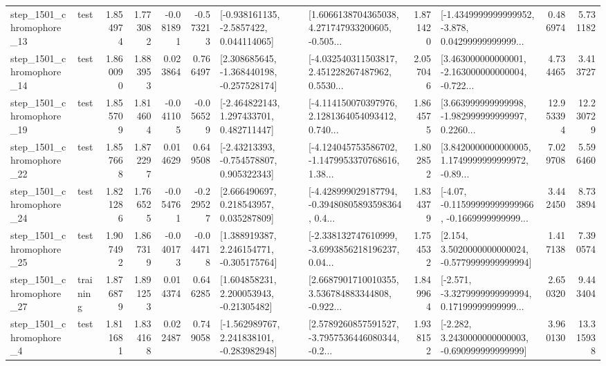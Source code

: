 \begin{tabular}{llrrrrllrlrr}
 step\_1501\_chromophore\_13 &      test &      1.854974 &    1.773082 &     -0.081891 & -0.573213 &     [-0.938161135, -2.5857422, 0.044114065] &  [1.6066138704365038, 4.271747933200605, -0.505... &       1.871420 &  [-1.4349999999999952, -3.878, 0.04299999999999... &            0.486974 &          5.731182 \\
 step\_1501\_chromophore\_14 &      test &      1.860090 &    1.883953 &      0.023864 &  0.766497 &   [2.308685645, -1.368440198, -0.257528174] &  [-4.032540311503817, 2.451228267487962, 0.5530... &       2.057046 &  [3.463000000000001, -2.163000000000004, -0.722... &            4.734465 &          3.413727 \\
 step\_1501\_chromophore\_19 &      test &      1.855709 &    1.814604 &     -0.041105 & -0.056529 &    [-2.464822143, 1.297433701, 0.482711447] &  [-4.114150070397976, 2.1281364054093412, 0.740... &       1.864575 &  [3.663999999999998, -1.982999999999997, 0.2260... &           12.953394 &         12.230729 \\
 step\_1501\_chromophore\_22 &      test &      1.857668 &    1.872297 &      0.014629 &  0.649508 &    [-2.43213393, -0.754578807, 0.905322343] &  [-4.124045753586702, -1.1479953370768616, 1.38... &       1.802852 &  [3.8420000000000005, 1.1749999999999972, -0.89... &            7.029708 &          5.596460 \\
 step\_1501\_chromophore\_24 &      test &      1.821286 &    1.766525 &     -0.054761 & -0.229527 &     [2.666490697, 0.218543957, 0.035287809] &  [-4.428999029187794, -0.39480805893598364, 0.4... &       1.834379 &  [-4.07, -0.11599999999999966, -0.1669999999999... &            3.442450 &          8.733894 \\
 step\_1501\_chromophore\_25 &      test &      1.907492 &    1.867319 &     -0.040173 & -0.044718 &    [1.388919387, 2.246154771, -0.305175764] &  [-2.338132747610999, -3.6993856218196237, 0.04... &       1.754532 &   [2.154, 3.5020000000000024, -0.5779999999999994] &            1.417138 &          7.390574 \\
 step\_1501\_chromophore\_27 &  training &      1.876879 &    1.891253 &      0.014374 &  0.646285 &     [1.604858231, 2.200053943, -0.21305482] &  [2.6687901710010355, 3.536784883344808, -0.922... &       1.849964 &  [-2.571, -3.3279999999999994, 0.17199999999999... &            2.650320 &          9.443404 \\
  step\_1501\_chromophore\_4 &      test &      1.811681 &    1.834168 &      0.022487 &  0.749058 &   [-1.562989767, 2.241838101, -0.283982948] &  [2.5789260857591527, -3.7957536446080344, -0.2... &       1.938152 &   [-2.282, 3.2430000000000003, -0.690999999999999] &            3.960130 &         13.315938 \\

\end{tabular}
